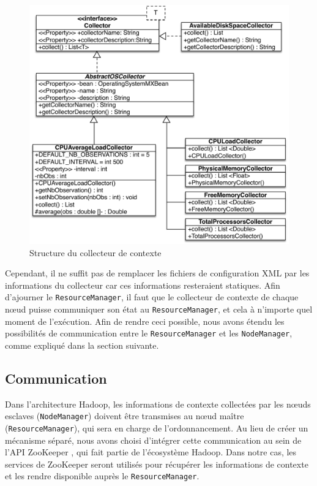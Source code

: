 \begin{figure}[!ht]
	\centering
	\includegraphics[width=0.75\linewidth]{img/CollectorUML2.pdf}
	\caption{Structure du collecteur de contexte}
	\label{fig:CollectorDiag}
\end{figure}

Cependant, il ne suffit pas de remplacer les fichiers de configuration XML par les informations du collecteur car ces informations resteraient statiques. Afin d'ajourner le \texttt{ResourceManager}, il faut que le collecteur de contexte de chaque n{\oe}ud puisse communiquer son état au \texttt{ResourceManager}, et cela à n'importe quel moment de l'exécution. Afin de rendre ceci possible, nous avons étendu les possibilités de communication entre le \texttt{ResourceManager} et les \texttt{NodeManager}, comme expliqué dans la section suivante.    

\subsection{Communication}
Dans l'architecture Hadoop, les informations de contexte collectées par les n{\oe}uds esclaves (\texttt{NodeManager}) doivent être transmises au n{\oe}ud maître (\texttt{ResourceManager}), qui sera en charge de l'ordonnancement. Au lieu de créer un mécanisme séparé, nous avons choisi d'intégrer cette communication au sein de l'API ZooKeeper \cite{Hunt2010}, qui fait partie de l'écosystème Hadoop. Dans notre cas, les services de ZooKeeper seront utilisés pour récupérer les informations de contexte et les rendre disponible auprès le \texttt{ResourceManager}. 

